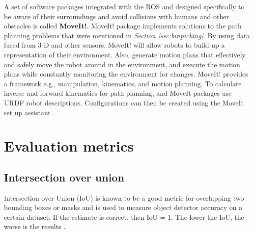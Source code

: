 A set of software packages integrated with the ROS and designed specifically to be aware of their surroundings and avoid collisions with humans and other obstacles is called \textbf{MoveIt!}. MoveIt! package implements solutions to the path planning problems that were mentioned in \textit{Section \ref{sec:binpicking}}. 
By using data fused from 3-D and other sensors, MoveIt! will allow robots to build up a representation of their environment. Also, generate motion plans that effectively and safely move the robot around in the environment, and execute the motion plans while constantly monitoring the environment for changes. 
MoveIt! provides a framework e.g., manipulation, kinematics, and motion planning. To calculate inverse and forward kinematics for path planning, and MoveIt packages use URDF robot descriptions. Configurations can then be created using the MoveIt set up assistant \cite{chitta_moveitros_2012}.

\section{Evaluation metrics}
\subsection{Intersection over union}
Intersection over Union (IoU) is known to be a good metric for overlapping two bounding boxes or masks and is used to measure object detector accuracy on a certain dataset. If the estimate is correct, then IoU = 1. The lower the IoU, the worse is the results \cite{sheremet_intersection_2020}.

